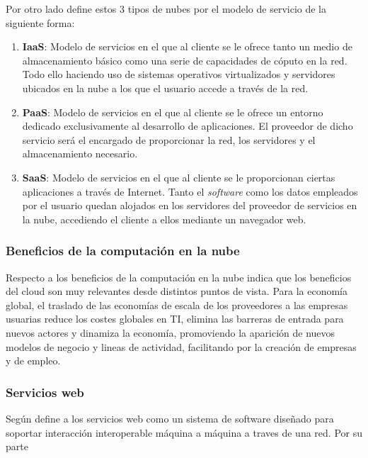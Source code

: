 Por otro lado \cite{msolutions} define estos 3 tipos de nubes por el modelo de servicio
de la siguiente forma:
\begin{enumerate}
    \item \textbf{IaaS}: Modelo de servicios en el que al cliente se le ofrece tanto un
          medio de almacenamiento básico como una serie de capacidades de cóputo en la red.
          Todo ello haciendo uso de sistemas operativos virtualizados y servidores ubicados
          en la nube a los que el usuario accede a través de la red.
    \item \textbf{PaaS}: Modelo de servicios en el que al cliente se le ofrece un entorno
          dedicado exclusivamente al desarrollo de aplicaciones. El proveedor de dicho servicio será
          el encargado de proporcionar la red, los servidores y el almacenamiento necesario.
    \item \textbf{SaaS}: Modelo de servicios en el que al cliente se le proporcionan ciertas aplicaciones
          a través de Internet. Tanto el \emph{software} como los datos empleados por el usuario
          quedan alojados en los servidores del proveedor de servicios en la nube, accediendo el cliente
          a ellos mediante un navegador web.
\end{enumerate}
\subsubsection{Beneficios de la computación en la nube}
Respecto a los beneficios de la computación en la nube \cite{cierco} indica que los beneficios
del cloud son muy relevantes desde distintos puntos de vista.
Para la economía global, el traslado de las economías de escala de los
proveedores a las empresas usuarias reduce los costes globales en TI, elimina
las barreras de entrada para nuevos actores y dinamiza la economía, promoviendo
la aparición de nuevos modelos de negocio y lineas de actividad, facilitando
por la creación de empresas y de empleo.
\subsubsection{Servicios web}

Según \cite{w3c} define a los servicios web como un sistema de software diseñado
para soportar interacción interoperable máquina a máquina a traves de una red.
Por su parte
